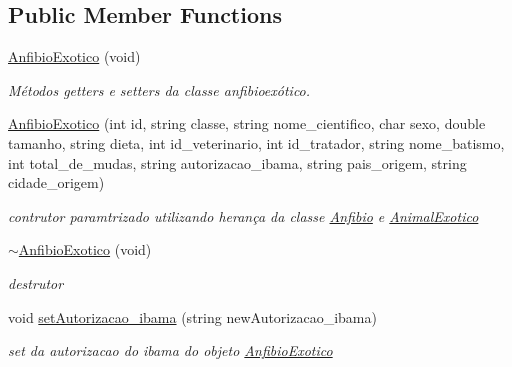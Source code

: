 \subsection*{Public Member Functions}
\begin{DoxyCompactItemize}
\item 
\mbox{\label{class_anfibio_exotico_aa8ef9d3a1aa96fbba6d4b480e7553b96}} 
\mbox{\hyperlink{class_anfibio_exotico_aa8ef9d3a1aa96fbba6d4b480e7553b96}{Anfibio\+Exotico}} (void)
\begin{DoxyCompactList}\small\item\em Métodos getters e setters da classe anfibioexótico. \end{DoxyCompactList}\item 
\mbox{\label{class_anfibio_exotico_ae400a19973b8a2984da24de9c409729c}} 
\mbox{\hyperlink{class_anfibio_exotico_ae400a19973b8a2984da24de9c409729c}{Anfibio\+Exotico}} (int id, string classe, string nome\+\_\+cientifico, char sexo, double tamanho, string dieta, int id\+\_\+veterinario, int id\+\_\+tratador, string nome\+\_\+batismo, int total\+\_\+de\+\_\+mudas, string autorizacao\+\_\+ibama, string pais\+\_\+origem, string cidade\+\_\+origem)
\begin{DoxyCompactList}\small\item\em contrutor paramtrizado utilizando herança da classe \mbox{\hyperlink{class_anfibio}{Anfibio}} e \mbox{\hyperlink{class_animal_exotico}{Animal\+Exotico}} \end{DoxyCompactList}\item 
\mbox{\label{class_anfibio_exotico_a5c3e0b91070abd28d81a623a1713d0dd}} 
\mbox{\hyperlink{class_anfibio_exotico_a5c3e0b91070abd28d81a623a1713d0dd}{$\sim$\+Anfibio\+Exotico}} (void)
\begin{DoxyCompactList}\small\item\em destrutor \end{DoxyCompactList}\item 
void \mbox{\hyperlink{class_anfibio_exotico_a7cbbeb699ceaa0bcf42bfd0815286e1c}{set\+Autorizacao\+\_\+ibama}} (string new\+Autorizacao\+\_\+ibama)
\begin{DoxyCompactList}\small\item\em set da autorizacao do ibama do objeto \mbox{\hyperlink{class_anfibio_exotico}{Anfibio\+Exotico}} \end{DoxyCompactList}\item 

\end{DoxyCompactItemize}
